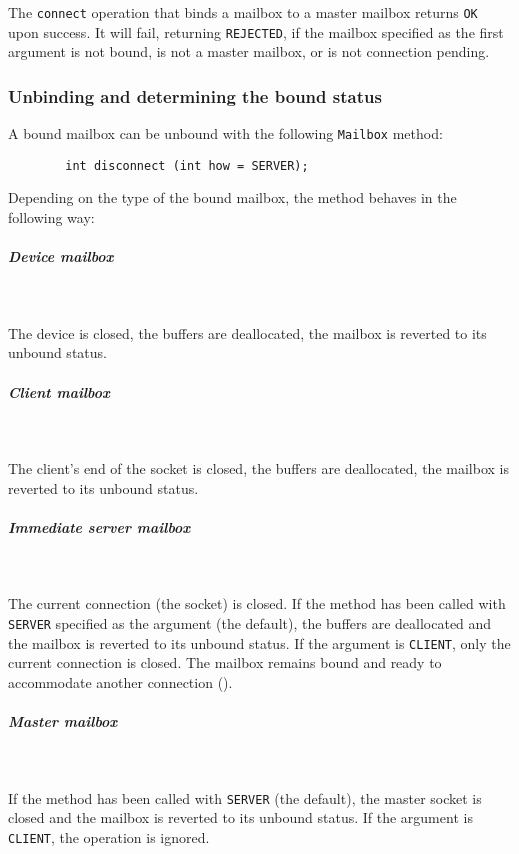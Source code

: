\medskip

\noindent
The {\tt connect} operation that binds a mailbox to a master mailbox
returns {\tt OK} upon success.
It will fail, returning {\tt REJECTED}, if the mailbox specified as the
first argument is not bound, is not a master mailbox, or is not
connection pending.

\subsubsection{Unbinding and determining the bound status}
\label{rm_mb_bo_ub}

A bound mailbox can be unbound with the following {\tt Mailbox} method:
\begin{verbatim}
        int disconnect (int how = SERVER);
\end{verbatim}

Depending on the type of the bound mailbox, the method behaves in
the following way:

\subparagraph*{Device mailbox}\mbox{~}\vspace{0.1in}

\noindent
The device is closed, the buffers are deallocated, the mailbox is reverted
to its unbound status.

\subparagraph*{Client mailbox}\mbox{~}\vspace{0.1in}

\noindent
The client's end of the socket is closed, the buffers are deallocated,
the mailbox is reverted to its unbound status.

\subparagraph*{Immediate server mailbox}\mbox{~}\vspace{0.1in}

\noindent
The current connection (the socket) is closed.
If the method has been called with {\tt SERVER} specified as the argument
(the default),
the buffers are deallocated and the mailbox is reverted to its unbound
status.
If the argument is {\tt CLIENT}, only the current connection is closed.
The mailbox remains bound and ready
to accommodate another connection ().

\subparagraph*{Master mailbox}\mbox{~}\vspace{0.1in}

\noindent
If the method has been called with {\tt SERVER} (the default),
the master socket is closed and the mailbox is reverted to its
unbound status.
If the argument is {\tt CLIENT}, the operation is ignored.

\medskip

